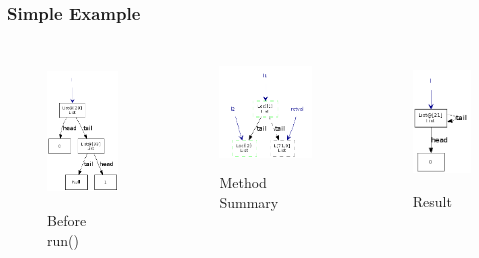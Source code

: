 \documentclass[hyperref={pdfpagelabels=false}]{beamer}
\begin{document}
\begin{frame}[fragile]
\frametitle{Simple Example}
  \begin{columns}
    \begin{column}{0.3\textwidth}
      \begin{figure}[t]
        \includegraphics[height=40mm]{images/bef.png}\\
        \vspace{15pt}
        Before run()
      \end{figure}
    \end{column}
    \begin{column}{0.4\textwidth}
      \begin{figure}[t]
        \includegraphics[height=30mm]{images/run_sum.png}\\
        \vspace{15pt}
        Method Summary
      \end{figure}
    \end{column}
    \begin{column}{0.3\textwidth}
      \begin{figure}[t]
        \includegraphics[height=35mm]{images/aft.png}\\
        \vspace{15pt}
        Result
      \end{figure}
    \end{column}
  \end{columns}
\end{frame}
\end{document}
